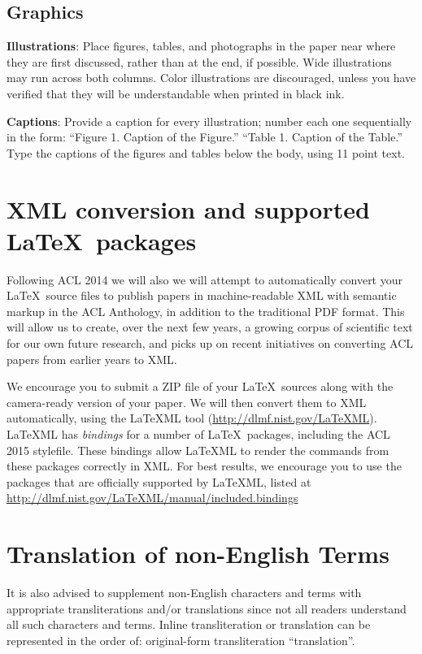 \documentclass[11pt]{article}
\begin{document}
\subsection{Graphics}

{\bf Illustrations}: Place figures, tables, and photographs in the
paper near where they are first discussed, rather than at the end, if
possible.  Wide illustrations may run across both columns.  Color
illustrations are discouraged, unless you have verified that  
they will be understandable when printed in black ink.

{\bf Captions}: Provide a caption for every illustration; number each one
sequentially in the form:  ``Figure 1. Caption of the Figure.'' ``Table 1.
Caption of the Table.''  Type the captions of the figures and 
tables below the body, using 11 point text.


\section{XML conversion and supported \LaTeX\ packages}

Following ACL 2014 we will also we will attempt to automatically convert 
your \LaTeX\ source files to publish papers in machine-readable 
XML with semantic markup in the ACL Anthology, in addition to the 
traditional PDF format.  This will allow us to create, over the next 
few years, a growing corpus of scientific text for our own future research, 
and picks up on recent initiatives on converting ACL papers from earlier 
years to XML. 

We encourage you to submit a ZIP file of your \LaTeX\ sources along
with the camera-ready version of your paper. We will then convert them
to XML automatically, using the LaTeXML tool
(\url{http://dlmf.nist.gov/LaTeXML}). LaTeXML has \emph{bindings} for
a number of \LaTeX\ packages, including the ACL 2015 stylefile. These
bindings allow LaTeXML to render the commands from these packages
correctly in XML. For best results, we encourage you to use the
packages that are officially supported by LaTeXML, listed at
\url{http://dlmf.nist.gov/LaTeXML/manual/included.bindings}





\section{Translation of non-English Terms}

It is also advised to supplement non-English characters and terms
with appropriate transliterations and/or translations
since not all readers understand all such characters and terms.
Inline transliteration or translation can be represented in
the order of: original-form transliteration ``translation''.
\end{document}
